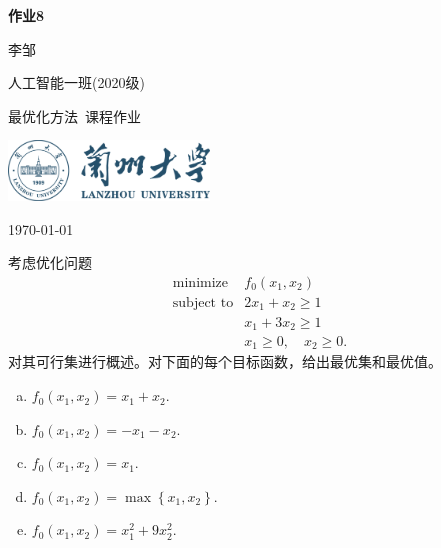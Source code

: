 \documentclass[10pt, a4paper]{article}
\newcommand\course{最优化方法}                         %
\begin{document}
\begin{titlepage}
    \begin{center}
        \vspace*{3.5cm}
            
        \Huge
        \textbf{作业8}
            
        \vspace{2cm}
        \LARGE
        李邹
            
        \vspace{0.1cm}
        \Large
        人工智能一班(2020级)                      %
        
            
        \vfill
        
        \course \ 课程作业
            
        \vspace{1cm}
            
        \includegraphics[width=0.4\textwidth]{lzu-logo.png}
        \\
        
        \Large
        
        \today
            
    \end{center}
\end{titlepage}


\newpage
\begin{Problem}
    考虑优化问题
    $$
    \begin{array}{ll}
    \operatorname{minimize} & f_{0}\left(x_{1}, x_{2}\right) \\
    \text {subject to} & 2 x_{1}+x_{2} \geq 1 \\
    & x_{1}+3 x_{2} \geq 1 \\
    & x_{1} \geq 0, \quad x_{2} \geq 0 .
    \end{array}
    $$
    对其可行集进行概述。对下面的每个目标函数，给出最优集和最优值。
    \begin{enumerate}[(a)]
    \item $f_{0}\left(x_{1}, x_{2}\right)=x_{1}+x_{2}$.
    \item $f_{0}\left(x_{1}, x_{2}\right)=-x_{1}-x_{2}$.
    \item $f_{0}\left(x_{1}, x_{2}\right)=x_{1}$.
    \item $f_{0}\left(x_{1}, x_{2}\right)=\max \left\{x_{1}, x_{2}\right\}$.
    \item $f_{0}\left(x_{1}, x_{2}\right)=x_{1}^{2}+9 x_{2}^{2}$.
    \end{enumerate}
\end{Problem}
    
\end{document}

